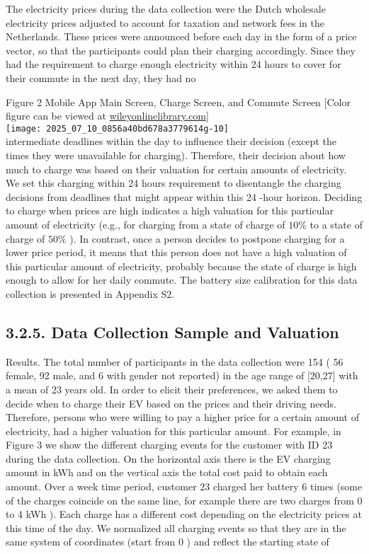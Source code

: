 \documentclass[10pt]{article}
\begin{document}
The electricity prices during the data collection were the Dutch wholesale electricity prices adjusted to account for taxation and network fees in the Netherlands. These prices were announced before each day in the form of a price vector, so that the participants could plan their charging accordingly. Since they had the requirement to charge enough electricity within 24 hours to cover for their commute in the next day, they had no

Figure 2 Mobile App Main Screen, Charge Screen, and Commute Screen [Color figure can be viewed at \href{http://wileyonlinelibrary.com}{wileyonlinelibrary.com}]\\
\texttt{[image: 2025\_07\_10\_0856a40bd678a3779614g-10]}\\
intermediate deadlines within the day to influence their decision (except the times they were unavailable for charging). Therefore, their decision about how much to charge was based on their valuation for certain amounts of electricity. We set this charging within 24 hours requirement to disentangle the charging decisions from deadlines that might appear within this 24 -hour horizon. Deciding to charge when prices are high indicates a high valuation for this particular amount of electricity (e.g., for charging from a state of charge of $10 \%$ to a state of charge of $50 \%$ ). In contrast, once a person decides to postpone charging for a lower price period, it means that this person does not have a high valuation of this particular amount of electricity, probably because the state of charge is high enough to allow for her daily commute. The battery size calibration for this data collection is presented in Appendix S2.

\subsection*{3.2.5. Data Collection Sample and Valuation}
Results. The total number of participants in the data collection were 154 ( 56 female, 92 male, and 6 with gender not reported) in the age range of [20,27] with a mean of 23 years old. In order to elicit their preferences, we asked them to decide when to charge their EV based on the prices and their driving needs. Therefore, persons who were willing to pay a higher price for a certain amount of electricity, had a higher valuation for this particular amount. For example, in Figure 3 we show the different charging events for the customer with ID 23 during the data collection. On the horizontal axis there is the EV charging amount in kWh and on the vertical axis the total cost paid to obtain each amount. Over a week time period, customer 23 charged her battery 6 times (some of the charges coincide on the same line, for example there are two charges from 0 to 4 kWh ). Each charge has a different cost depending on the electricity prices at this time of the day. We normalized all charging events so that they are in the same system of coordinates (start from 0 ) and reflect the starting state of
\end{document}
